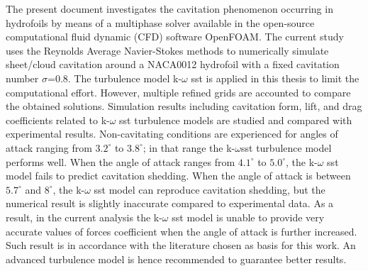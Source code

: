 \newpage
\renewcommand{\thepage}{\roman{page}}

\begin{changemargin}{1cm}{1cm}

\begin{Abstract}
\thispagestyle{plain}
\vspace{1cm}
The present document investigates the cavitation phenomenon
occurring in hydrofoils by means of a multiphase solver available 
in the open-source computational fluid dynamic (CFD) software 
OpenFOAM\textsuperscript{\textregistered}. The current study uses 
the Reynolds Average Navier-Stokes methods to numerically 
simulate sheet/cloud cavitation around a NACA0012 hydrofoil
with a fixed cavitation number $\sigma$=0.8. 
The turbulence model k-$\omega$ sst is applied in this thesis to limit
the computational effort. However, multiple refined grids are accounted 
to compare the obtained solutions. Simulation results including cavitation 
form, lift, and drag coefficients related to k-$\omega$ sst turbulence models 
are studied and compared with experimental results. Non-cavitating conditions 
are experienced for angles of attack ranging from $3.2^{\circ}$ to $3.8^{\circ}$; 
in that range the k-$\omega$sst turbulence model performs well. When the angle of 
attack ranges from $4.1^{\circ}$ to $5.0^{\circ}$, the k-$\omega$ sst model fails
to predict cavitation shedding. When the angle of attack is between $5.7^{\circ}$
and $8^{\circ}$, the k-$\omega$ sst model can reproduce cavitation shedding, 
but the numerical result is slightly inaccurate compared to experimental data.
As a result, in the current analysis the k-$\omega$ sst model is unable to 
provide very accurate values of forces coefficient when the angle of attack 
is further increased. Such result is in accordance with the literature chosen 
as basis for this work. An advanced turbulence model is hence recommended 
to guarantee better results.


\end{Abstract}
\end{changemargin}
